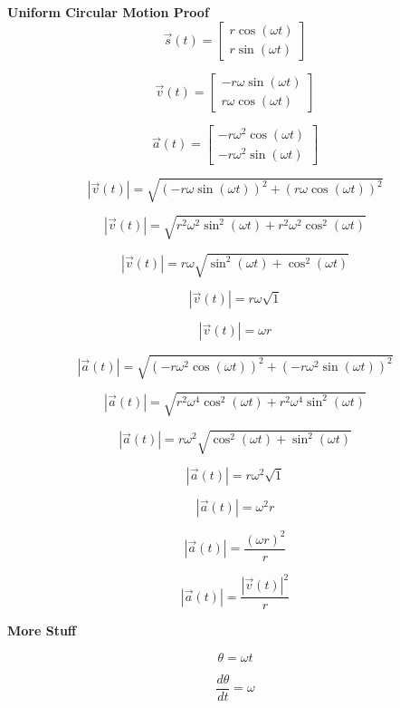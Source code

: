 \documentclass[12pt,letterpaper]{article}
\begin{document}
\textbf{Uniform Circular Motion Proof} \\

$$\vec{s}(t) = \begin{bmatrix} r\cos(\omega t) \\ r\sin(\omega t) \end{bmatrix}$$ 

$$\vec{v}(t) = \begin{bmatrix} -r\omega \sin (\omega t) \\ r \omega \cos(\omega t) \end{bmatrix}$$ 

$$\vec{a}(t) = \begin{bmatrix} -r\omega^2 \cos (\omega t) \\ -r \omega^2 \sin(\omega t) \end{bmatrix}$$ 

$$|\vec{v}(t)| = \sqrt{(-r\omega \sin (\omega t))^2 + (r \omega \cos(\omega t))^2}$$

$$|\vec{v}(t)| = \sqrt{r^2\omega^2 \sin^2(\omega t) + r^2 \omega^2 \cos^2(\omega t)}$$ 

$$|\vec{v}(t)| = r\omega \sqrt{\sin^2(\omega t) + \cos^2(\omega t)}$$

$$|\vec{v}(t)| = r\omega \sqrt{1}$$

$$|\vec{v}(t)| =  \omega r$$

$$|\vec{a}(t)| = \sqrt{( -r\omega^2 \cos (\omega t))^2 + (-r \omega^2 \sin(\omega t))^2}$$

$$|\vec{a}(t)| = \sqrt{r^2 \omega^4 \cos^2(\omega t) + r^2 \omega^4 \sin^2(\omega t)}$$

$$|\vec{a}(t)| = r \omega ^2 \sqrt{\cos^2(\omega t) + \sin^2(\omega t)}$$

$$|\vec{a}(t)| = r \omega ^2 \sqrt{1}$$

$$|\vec{a}(t)| = \omega ^2 r$$

$$|\vec{a}(t)| = \dfrac{(\omega r)^2}{r}$$

$$|\vec{a}(t)| = \dfrac{|\vec{v}(t)|^2}{r}$$

\textbf{More Stuff}

$$\theta = \omega t$$

$$\dfrac{d\theta}{dt}  = \omega$$
\end{document}
